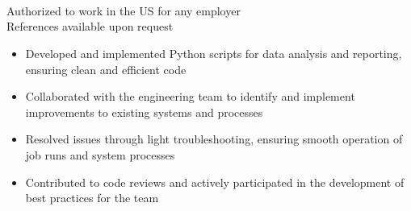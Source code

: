{\begin{minipage}[t]{13.5cm}
\begin{minipage}[t]{6.5cm}
      \hfill{}\\
      \hfill{}\\
      \hfill{}\\
    \end{minipage}
    \par\bigskip
    \par\bigskip
    \begin{minipage}{13.5cm}
      \begin{center}
        Authorized to work in the US for any employer\\
        References available upon request
      \end{center}
    \end{minipage}
  \end{minipage}
}
\makecvheader

\par\bigskip
{}
\par\smallskip
\begin{minipage}{13.75cm}
  \begin{minipage}{6.5cm}
    \begin{itemize}
      \item Developed and implemented Python scripts for data analysis and reporting, ensuring clean and efficient code
      \item Collaborated with the engineering team to identify and implement improvements to existing systems and processes
    \end{itemize}
  \end{minipage}
  \hfill
  \begin{minipage}{6.5cm}
    \begin{itemize}
      \item Resolved issues through light troubleshooting, ensuring smooth operation of job runs and system processes
      \item Contributed to code reviews and actively participated in the development of best practices for the team
    \end{itemize}
  \end{minipage}
\end{minipage}
\par\smallskip
\divider


